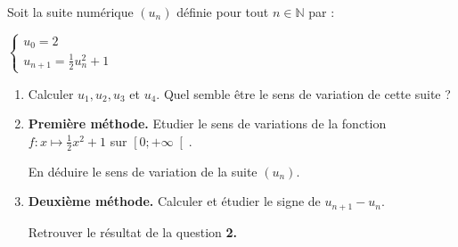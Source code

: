 
%
Soit la suite numérique $\left(u_{n}\right)$ définie pour tout $n \in  \mathbb{N}$ par :
\par
$\left\{ \begin{matrix} u_{0}=2 \\ u_{n+1} =\frac{1}{2}u_{n}^{2}+1\end{matrix}\right.$
     \begin{enumerate}
          \item
          Calculer $u_{1}, u_{2}, u_{3}$ et $u_{4}$. Quel semble être le sens de variation de cette suite ?
          \item
          \textbf{Première méthode.}
          Etudier le sens de variations de la fonction $f : x\mapsto \frac{1}{2}x^{2}+1$ sur $\left[0; +\infty \right[$.
          \par
          En déduire le sens de variation de la suite $\left(u_{n}\right)$.
          \item
          \textbf{Deuxième méthode.}
          Calculer et étudier le signe de $u_{n+1}-u_{n}$.
          \par
          Retrouver le résultat de la question \textbf{2.}
     \end{enumerate}
     \begin{corrige}

     \end{corrige}

